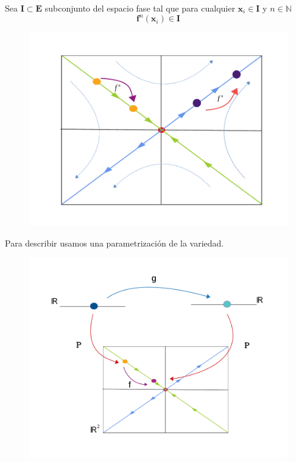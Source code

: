 \documentclass[11pt]{beamer}
\theoremstyle{definition}
\begin{document}
\begin{frame}
\begin{definition}
Sea  $\mathbf{I} \subset \mathbf{E}$ subconjunto del espacio fase tal que para cualquier $\mathbf{x}_{i}\in  \mathbf{I}$  y $ n\in\mathbb{N}$ 
\begin{equation}
\mathbf{f}^{n}(\mathbf{x}_{i}) \in \mathbf{I}
\end{equation}
\end{definition}
\begin{figure}
	\includegraphics[scale=0.45]{hyperbolic2A.pdf}
\end{figure}
\end{frame}
\begin{frame}
Para describir usamos una parametrizaci\'on de la variedad.
\begin{figure}
	\includegraphics[scale=0.35]{diagrama-c2.pdf}
\end{figure}
\end{frame}
\end{document}

